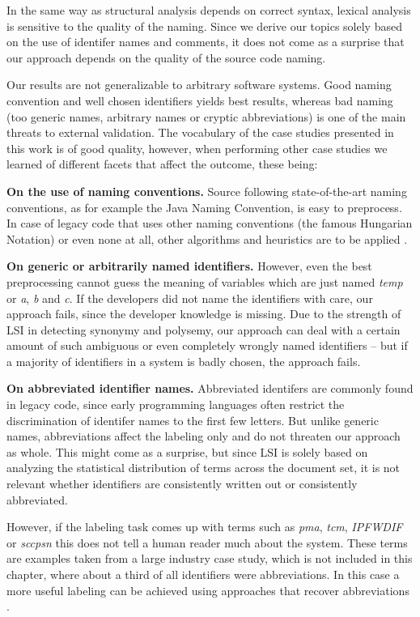 In the same way as structural analysis depends on correct syntax, lexical analysis is sensitive to the quality of the naming. Since we derive our topics solely based on the use of identifer names and comments, it does not come as a surprise that our approach depends on the quality of the source code naming.

Our results are not generalizable to arbitrary software systems. Good naming convention and well chosen identifiers yields best results, whereas bad naming (\ie too generic names, arbitrary names or cryptic abbreviations) is one of the main threats to external validation. The vocabulary of the case studies presented in this work is of good quality, however, when performing other case studies we learned of different facets that affect the outcome, these being:

\textbf{On the use of naming conventions.} Source following state-of-the-art naming conventions, as for example the Java Naming Convention, is easy to preprocess. In case of legacy code that uses other naming conventions (\eg the famous Hungarian Notation) or even none at all, other algorithms and heuristics are to be applied \cite{Capr93a,Anqu98b}.

\textbf{On generic or arbitrarily named identifiers.} However, even the best preprocessing cannot guess the meaning of variables which are just named \emph{temp} or \emph{a}, \emph{b} and \emph{c}. If the developers did not name the identifiers with care, our approach fails, since the developer knowledge is missing. Due to the strength of LSI in detecting synonymy and polysemy, our approach can deal with a certain amount of such ambiguous or even completely wrongly named identifiers -- but if a majority of identifiers in a system is badly chosen, the approach fails.

\textbf{On abbreviated identifier names.} Abbreviated identifers are commonly found in legacy code, since early programming languages often restrict the discrimination of identifer names to the first few letters. But unlike generic names, abbreviations affect the labeling only and do not threaten our approach  as whole. This might come as a surprise, but since LSI is solely based on analyzing the statistical distribution of terms across the document set, it is not relevant whether identifiers are consistently written out or consistently abbreviated.

However, if the labeling task comes up with terms such as \emph{pma}, \emph{tcm}, \emph{IPFWDIF} or \emph{sccpsn} this does not tell a human reader much about the system. These terms are examples taken from a large industry case study, which is not included in this chapter, where about a third of all identifiers were abbreviations. In this case a more useful labeling can be achieved using approaches that recover abbreviations \cite{Anqu98b}.

